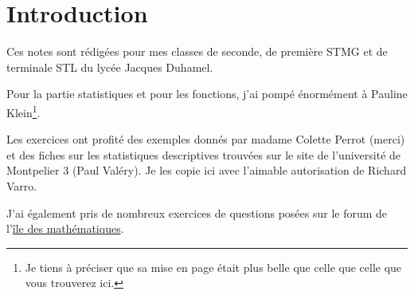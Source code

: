 
\section*{Introduction}

Ces notes sont rédigées pour mes classes de seconde, de première STMG et de terminale STL du lycée Jacques Duhamel.

Pour la partie statistiques et pour les fonctions, j'ai pompé énormément à Pauline Klein\footnote{Je tiens à préciser que sa mise en page était plus belle que celle que celle que vous trouverez ici.}.

Les exercices ont profité des exemples donnés par madame Colette Perrot (merci) et des fiches \cite{qyKnLf} sur les statistiques descriptives trouvées sur le site de l'université de Montpelier 3 (Paul Valéry). Je les copie ici avec l'aimable autorisation de Richard Varro.

J'ai également pris de nombreux exercices de questions posées sur le forum de l'\href{http://www.ilemaths.net/forum_lycee.php}{île des mathématiques}.

